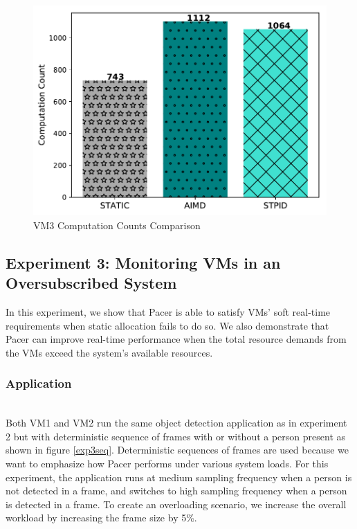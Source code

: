 \begin{figure}[h!]
\centering
\includegraphics[width=.9\linewidth]{images/matmul}
\caption{VM3 Computation Counts Comparison}
\label{matmul}
\end{figure}







\subsection{Experiment 3: Monitoring VMs in an Oversubscribed System}

In this experiment, we show that Pacer is able to satisfy VMs' soft real-time requirements when static allocation fails to do so. We also demonstrate that Pacer can improve real-time performance when the total resource demands from the VMs exceed the system's available resources.


\subsubsection*{Application}\hfill\\
\indent Both VM1 and VM2 run the same object detection application as in experiment 2 but with deterministic sequence of frames with or without a person present as shown in figure \ref{exp3seq}. Deterministic sequences of frames are used because we want to emphasize how Pacer performs under various system loads. For this experiment, the application runs at medium sampling frequency when a person is not detected in a frame, and switches to high sampling frequency when a person is detected in a frame. To create an overloading scenario, we increase the overall workload by increasing the frame size by 5\%.


